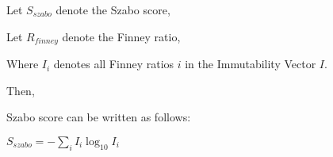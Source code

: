 \documentclass[english]{article}
\begin{document}
Let $S_{szabo}$ denote the Szabo score,

Let $R$$_{finney}$ denote the Finney ratio,

Where $I_{i}$ denotes all Finney ratios $i$ in the Immutability
Vector $I$.

Then,

Szabo score can be written as follows:

$S_{szabo}=-\sum_{i}I_{i}\log_{10}I_{i}$
\end{document}
